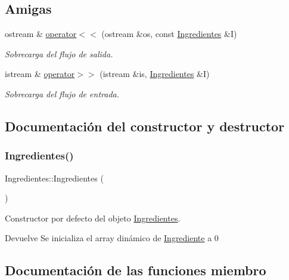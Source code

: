 \subsection*{Amigas}
\begin{DoxyCompactItemize}
\item 
ostream \& \hyperlink{classIngredientes_a933ab431055a2a381448533ff8aa3299}{operator$<$$<$} (ostream \&os, const \hyperlink{classIngredientes}{Ingredientes} \&I)
\begin{DoxyCompactList}\small\item\em Sobrecarga del flujo de salida. \end{DoxyCompactList}\item 
istream \& \hyperlink{classIngredientes_afa2cabeefdee6cf26890ffd55bb3a7f3}{operator$>$$>$} (istream \&is, \hyperlink{classIngredientes}{Ingredientes} \&I)
\begin{DoxyCompactList}\small\item\em Sobrecarga del flujo de entrada. \end{DoxyCompactList}\end{DoxyCompactItemize}


\subsection{Documentación del constructor y destructor}
\mbox{\label{classIngredientes_a4599533b7d0530fe6fdd68006b3f0bde}} 
\subsubsection{\texorpdfstring{Ingredientes()}{Ingredientes()}}
{\footnotesize\ttfamily Ingredientes\+::\+Ingredientes (\begin{DoxyParamCaption}{ }\end{DoxyParamCaption})}



Constructor por defecto del objeto \hyperlink{classIngredientes}{Ingredientes}. 

\begin{DoxyReturn}{Devuelve}
Se inicializa el array dinámico de \hyperlink{classIngrediente}{Ingrediente} a 0 
\end{DoxyReturn}


\subsection{Documentación de las funciones miembro}
\mbox{\label{classIngredientes_a43faff99202867d2360a6774f3cd7c12}} 
